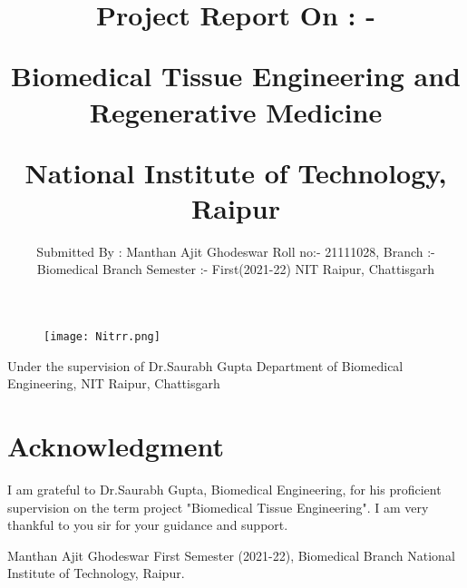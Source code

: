 \documentclass[12pt]{article}
\title{Project Report On : - 
\linebreak

Biomedical Tissue Engineering and Regenerative Medicine}
\begin{document}
\maketitle
\begin{figure}[h]
\centering
\texttt{[image: Nitrr.png]}
\end{figure}
\bigskip
\bigskip
\centering
\begin{large}
\title{National Institute of Technology, Raipur}
\end{large}
\medskip


\raggedright 
\begin{multicols}{2}
\author{Submitted By : Manthan Ajit Ghodeswar
\linebreak Roll no:- 21111028,
\linebreak Branch :- Biomedical Branch
\linebreak Semester :- First(2021-22)
\linebreak NIT Raipur, Chattisgarh}
\columnbreak
\columnbreak
\bigskip
\linebreak
Under the supervision of
\linebreak Dr.Saurabh Gupta
\linebreak Department of Biomedical Engineering,
\linebreak NIT Raipur, Chattisgarh
\end{multicols}

\clearpage

\centering
\tableofcontents
\clearpage

\section{Acknowledgment}
\raggedright
\bigskip
\bigskip
I am grateful to Dr.Saurabh Gupta, Biomedical Engineering, for his proficient supervision on the term project "Biomedical Tissue Engineering". I am very thankful to you sir for your guidance and support.
\linebreak
\linebreak
\linebreak
\linebreak
\linebreak

\raggedleft
Manthan Ajit Ghodeswar
\linebreak
First Semester (2021-22), Biomedical Branch
\linebreak
National Institute of Technology, Raipur.
\linebreak
\linebreak
\linebreak
\end{document}
